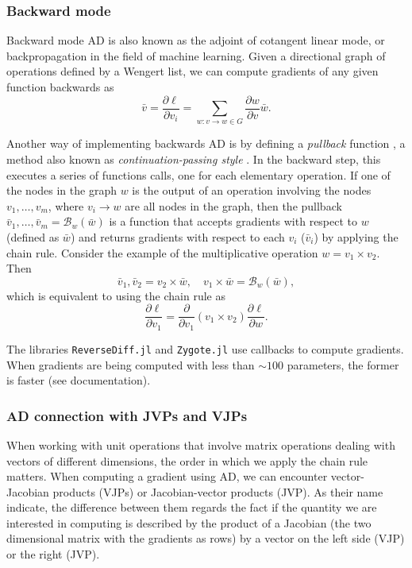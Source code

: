 \subsubsection{Backward mode}

Backward mode AD is also known as the adjoint of cotangent linear mode, or backpropagation in the field of machine learning. Given a directional graph of operations defined by a Wengert list, we can compute gradients of any given function backwards as
\begin{equation}
 \bar v = \frac{\partial \ell}{\partial v_i}= \sum_{w : v \rightarrow w \in G} \frac{\partial w}{\partial v} \bar{w}.
\end{equation}

Another way of implementing backwards AD is by defining a \textit{pullback} function \cite{Innes_2018}, a method also known as \textit{continuation-passing style} \cite{Wang_Zheng_Decker_Wu_Essertel_Rompf_2019}. In the backward step, this executes a series of functions calls, one for each elementary operation.
If one of the nodes in the graph $w$ is the output of an operation involving the nodes $v_1, \ldots, v_m$, where $v_i \rightarrow w$ are all nodes in the graph, then the pullback $\bar v_1, \ldots, \bar v_m = \mathcal B_w(\bar w)$ is a function that accepts gradients with respect to $w$ (defined as $\bar w$) and returns gradients with respect to each $v_i$ ($\bar v_i$) by applying the chain rule. Consider the example of the multiplicative operation $w = v_1 \times v_2$. Then
\begin{equation}
 \bar v_1, \bar v_2 = v_2 \times \bar w , \quad
 v_1 \times \bar w = \mathcal{B}_w (\bar w),
\end{equation}
which is equivalent to using the chain rule as
\begin{equation}
 \frac{\partial \ell}{\partial v_1} = \frac{\partial}{\partial v_1}(v_1 \times v_2) \frac{\partial \ell}{\partial w}.
\end{equation}

The libraries \texttt{ReverseDiff.jl} and \texttt{Zygote.jl} use callbacks to compute gradients. When gradients are being computed with less than $\sim 100$ parameters, the former is faster (see documentation).

\subsubsection{AD connection with JVPs and VJPs}

When working with unit operations that involve matrix operations dealing with vectors of different dimensions, the order in which we apply the chain rule matters. When computing a gradient using AD, we can encounter vector-Jacobian products (VJPs) or Jacobian-vector products (JVP). As their name indicate, the difference between them regards the fact if the quantity we are interested in computing is described by the product of a Jacobian (the two dimensional matrix with the gradients as rows) by a vector on the left
side (VJP) or the right (JVP).

